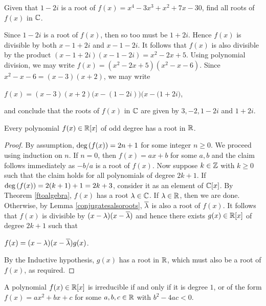\documentclass[11pt,fleqn,dvipsnames,usenames]{article}
\begin{document}
%
\begin{example}
Given that $1 - 2i$ is a root of $f(x) = x^4 - 3x^3 + x^2 + 7x - 30$, find all roots of $f(x)$ in $\mathbb{C}$.
\end{example}
%
\begin{solution}
Since $1 - 2i$ is a root of $f(x)$, then so too must be $1 + 2i$.  Hence $f(x)$ is divisible by both $x - 1 + 2i$ and $x - 1 - 2i$.  It follows that $f(x)$ is also divisible by the product $(x - 1 + 2i)(x - 1 - 2i) = x^2 - 2x + 5$.  Using polynomial division, we may write $f(x) = (x^2 - 2x + 5)(x^2 - x - 6)$.  Since $x^2 - x - 6 = (x - 3)(x + 2)$, we may write
\begin{center}
$f(x) = (x-3)(x+2)\big(x - (1-2i)\big)\big(x - (1+2i\big)$,
\end{center}
and conclude that the roots of $f(x)$ in $\mathbb{C}$ are given by $3, -2, 1-2i$ and $1+2i$.
\end{solution}
%
\begin{theorem}
Every polynomial $f(x)\in\mathbb{R}[x]$ of odd degree has a root in $\mathbb{R}$.
\end{theorem}
%
\begin{proof}
By assumption, $\text{deg}\left(f(x)\right) = 2n+1$ for some integer $n\geq 0$.  We proceed using induction on $n$.  If $n =0$, then $f(x) = ax+b$ for some $a,b$ and the claim follows immediately as $-b/a$ is a root of $f(x)$.  Now suppose $k\in\mathbb{Z}$ with $k\geq 0$ such that the claim holds for all polynomials of degree $2k+1$.  If $\text{deg}\left(f(x)\right) = 2(k+1) + 1 = 2k+3$, consider it as an element of $\mathbb{C}[x]$.  By Theorem \ref{ftoalgebra}, $f(x)$ has a root $\lambda\in\mathbb{C}$.  If $\lambda\in\mathbb{R}$, then we are done.  Otherwise, by Lemma \ref{conjugatesalsoroots}, $\overline{\lambda}$ is also a root of $f(x)$.  It follows that $f(x)$ is divisible by $(x-\lambda)(x -\overline{\lambda})$ and hence there exists $g(x)\in\mathbb{R}[x]$ of degree $2k+1$ such that
\begin{center}
$f(x) = (x-\lambda)(x -\overline{\lambda})g(x)$.
\end{center}
By the Inductive hypothesis, $g(x)$ has a root in $\mathbb{R}$, which must also be a root of $f(x)$, as required.
\end{proof}
%
\begin{corollary}
A polynomial $f(x)\in\mathbb{R}[x]$ is irreducible if and only if it is degree $1$, or of the form $f(x) = ax^{2} + bx + c$ for some $a,b,c\in\mathbb{R}$ with $b^2 - 4ac < 0$.
\end{corollary}
%
\end{document}
